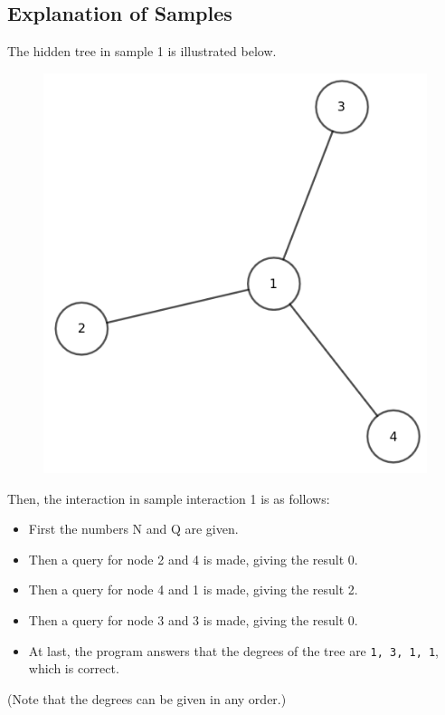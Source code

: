 \subsection*{Explanation of Samples}

The hidden tree in sample 1 is illustrated below.

\begin{figure}[h]
  \centering
  \includegraphics[scale=0.3]{example1.png}
\end{figure}

Then, the interaction in sample interaction 1 is as follows:

\begin{itemize}
  \item First the numbers N and Q are given.
  \item Then a query for node 2 and 4 is made, giving the result 0.
  \item Then a query for node 4 and 1 is made, giving the result 2.
  \item Then a query for node 3 and 3 is made, giving the result 0.
  \item At last, the program answers that the degrees of the tree are \texttt{1, 3, 1, 1}, which is correct.
\end{itemize}

(Note that the degrees can be given in any order.)

